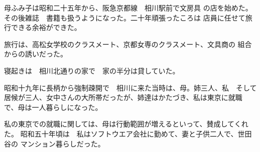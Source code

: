 
母ふみ子は昭和二十五年から、阪急京都線　相川駅前で文房具
の店を始めた。その後雑誌　書籍も扱うようになった。二十年頑張ったころは
店員に任せて旅行できる余裕ができた。

旅行は、高松女学校のクラスメート、京都女専のクラスメート、文具商の
組合からの誘いだった。

寝起きは　相川北通りの家で　家の半分は貸していた。

昭和十九年に長柄から強制疎開で　相川に来た当時は、母。姉三人、私　そして　
居候が三人、女中さんの大所帯だったが、姉達はかたづき、私は東京に就職
で、母は一人暮らしになった。

私の東京での就職に関しては、母は行動範囲が増えるといって、賛成してくれた。
昭和五十年頃は　私はソフトウエア会社に勤めて、妻と子供二人で、世田谷の
マンション暮らしだった。

